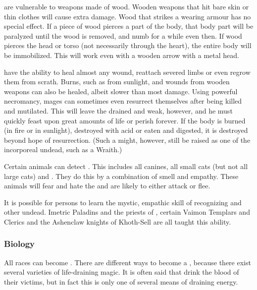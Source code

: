 \Reavers{} are vulnerable to weapons made of wood. Wooden weapons that hit bare skin or thin clothes will cause extra damage. Wood that strikes a \Reaver{} wearing armour has no special effect. If a piece of wood pierces a part of the \Reaverz{} body, that body part will be paralyzed until the wood is removed, and numb for a while even then. If wood pierces the head or torso  (not necessarily through the heart), the \Reaverz{} entire body will be immobilized. This will work even with a wooden arrow with a metal head. 

\Reavers{} have the ability to heal almost any wound, reattach severed limbs or even regrow them from scrath. Burns, such as from sunlight, and wounds from wooden weapons can also be healed, albeit slower than most damage. Using powerful necromancy, \Reaver{} mages can sometimes even resurrect themselves after being killed and mutilated. This will leave the \Reaver{} drained and weak, however, and he must quickly feast upon great amounts of life or perish forever. If the \Reaverz{} body is burned (in fire or in sunlight), destroyed with acid or eaten and digested, it is destroyed beyond hope of resurrection. (Such a \Reaver{} might, however, still be raised as one of the incorporeal undead, such as a Wraith.) 

Certain animals can detect \Reavers{}. This includes all canines, all small cats (but not all large cats) and \nycans{}. They do this by a combination of smell and empathy. These animals will fear and hate the \Reaver{} and are likely to either attack or flee. 

It is possible for persons to learn the mystic, empathic skill of recognizing \Reavers{} and other undead. Imetric Paladins and the priests of \NishiS{}, certain Vaimon Templars and Clerics and the Ashenclaw knights of Khoth-Sell are all taught this ability. 

\subsubsection{Biology}
All races can become \Reavers{}. There are different ways to become a \Reaver{}, because there exist several varieties of life-draining magic. It is often said that \Reavers{} drink the blood of their victims, but in fact this is only one of several means of draining energy. %

